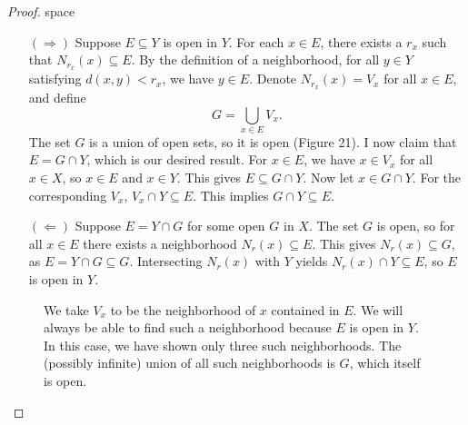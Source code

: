 \documentclass{article}
\theoremstyle{definition}
\begin{document}
\begin{proof}{\color{white}space}
	\begin{enumerate}
		\item[$ (\Longrightarrow) $] Suppose $ E\subseteq Y $ is open in $ Y $. For each $ x\in E $, there exists a $ r_x $ such that $ N_{r_x}(x)\subseteq E $. By the definition of a neighborhood, for all $ y\in Y $ satisfying $ d(x,y)<r_x $, we have $ y\in E $. Denote $ N_{r_x}(x)=V_x $ for all $ x\in E $, and define $$G=\bigcup_{x\in E}V_x .$$ The set $ G $ is a union of open sets, so it is open (Figure 21). I now claim that $ E=G\cap Y $, which is our desired result. For $ x\in E $, we have $ x\in V_x $ for all $ x\in X $, so $ x\in E $ and $ x\in Y $. This gives $ E\subseteq G\cap Y $. Now let $ x\in G\cap Y $. For the corresponding $ V_x $, $ V_x\cap Y\subseteq E $. This implies $ G\cap Y\subseteq E $.    
		\item[$ (\Longleftarrow) $] Suppose $ E=Y\cap G $ for some open $ G $ in $ X $. The set $ G $ is open, so for all $ x\in E $ there exists a neighborhood $ N_r(x)\subseteq E $. This gives $ N_r(x)\subseteq G $, as $ E=Y\cap G\subseteq G $. Intersecting $ N_r(x) $ with $ Y $ yields $ N_r(x)\cap Y\subseteq E $, so $ E $ is open in $ Y $.  
	\end{enumerate}	
 \begin{figure}[h!]
	\centering
	\caption{We take $ V_x $ to be the neighborhood of $ x $ contained in $ E $. We will always be able to find such a neighborhood because $ E $ is open in $ Y $. In this case, we have shown only three such neighborhoods. The (possibly infinite) union of all such neighborhoods is $ G $, which itself is open.}  
\end{figure}
\end{proof}
\end{document}

